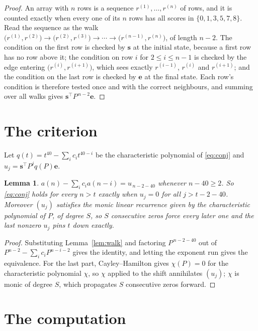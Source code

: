 \documentclass[11pt,a4paper]{article}
\theoremstyle{plain}
\newtheorem{lemma}[theorem]{Lemma}
\theoremstyle{definition}
\begin{document}
\begin{proof}
An array with $n$ rows is a sequence $r^{(1)},\dots,r^{(n)}$ of rows, and it is counted
exactly when every one of its $n$ rows has all scores in $\{0,1,3,5,7,8\}$. Read the sequence as the
walk $\bigl(r^{(1)},r^{(2)}\bigr)\to\bigl(r^{(2)},r^{(3)}\bigr)\to\cdots\to
\bigl(r^{(n-1)},r^{(n)}\bigr)$, of length $n-2$. The condition on the first row is
checked by $\mathbf{s}$ at the initial state, because a first row has no row above it; the
condition on row $i$ for $2\le i\le n-1$ is checked by the edge entering
$\bigl(r^{(i)},r^{(i+1)}\bigr)$, which sees exactly $r^{(i-1)}$, $r^{(i)}$ and
$r^{(i+1)}$; and the condition on the last row is checked by $\mathbf{e}$ at the final
state. Each row's condition is therefore tested once and with the correct neighbours, and
summing over all walks gives $\mathbf{s}^{\!\top}P^{\,n-2}\mathbf{e}$.
\end{proof}

\section{The criterion}

Let $q(t)=t^{40}-\sum_i c_i t^{40-i}$ be the characteristic polynomial of
\eqref{eq:conj} and $u_j=\mathbf{s}^{\!\top}P^{j}q(P)\mathbf{e}$.

\begin{lemma}\label{lem:crit}
$a(n)-\sum_i c_i a(n-i)=u_{\,n-2-40}$ whenever $n-40\ge2$. So \eqref{eq:conj}
holds for every $n>t$ exactly when $u_j=0$ for all $j>t-2-40$. Moreover $(u_j)$
satisfies the monic linear recurrence given by the characteristic polynomial of $P$, of
degree $S$, so $S$ consecutive zeros force every later one and the last nonzero $u_j$ pins
$t$ down exactly.
\end{lemma}

\begin{proof}
Substituting Lemma~\ref{lem:walk} and factoring $P^{\,n-2-40}$ out of
$P^{n-2}-\sum_i c_i P^{n-i-2}$ gives the identity, and letting the exponent run gives the
equivalence. For the last part, Cayley--Hamilton gives $\chi(P)=0$ for the characteristic
polynomial $\chi$, so $\chi$ applied to the shift annihilates $(u_j)$; $\chi$ is monic of
degree $S$, which propagates $S$ consecutive zeros forward.
\end{proof}

\section{The computation}
\end{document}
